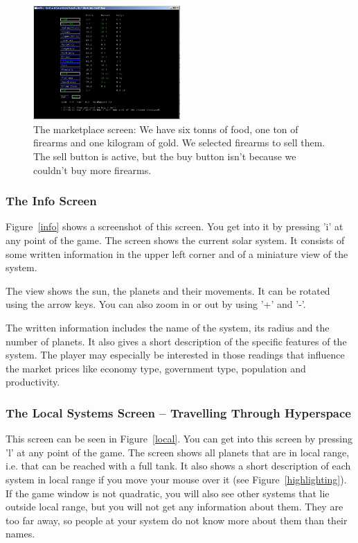 \documentclass[a4paper,11pt]{article}
\begin{document}
\begin{figure}[ht]
	\centering
		\includegraphics[width=0.50\textwidth]{mktscreen.jpg}
	  \caption{The marketplace screen: We have six tonns of food, one ton of firearms and one kilogram of gold. We selected firearms to sell them. The sell button is active, but the buy button isn't because we couldn't buy more firearms. \label{mkt}}
\end{figure}

\subsubsection{The Info Screen}

Figure~\ref{info} shows a screenshot of this screen.
You get into it by pressing 'i' at any point of the game. The screen shows the current solar system. It consists of some written information in the upper left corner and of a miniature view of the system. 

The view shows the sun, the planets and their movements. It can be rotated using the arrow keys. You can also zoom in or out by using '+' and '-'.

The written information includes the name of the system, its radius and the number of planets. It also gives a short description of the specific features of the system. The player may especially be interested in those readings that influence the market prices like economy type, government type, population and productivity.

\subsubsection{The Local Systems Screen -- Travelling Through Hyperspace}

This screen can be seen in Figure~\ref{local}. You can get into this screen by pressing 'l' at any point of the game. 
The screen shows all planets that are in local range, i.e. that can be reached with a full tank. It also shows a short description of each system in local range if you move your mouse over it (see Figure~\ref{highlighting}). If the game window is not quadratic, you will also see other systems that lie outside local range, but you will not get any information about them. They are too far away, so people at your system do not know more about them than their names.
\end{document}
